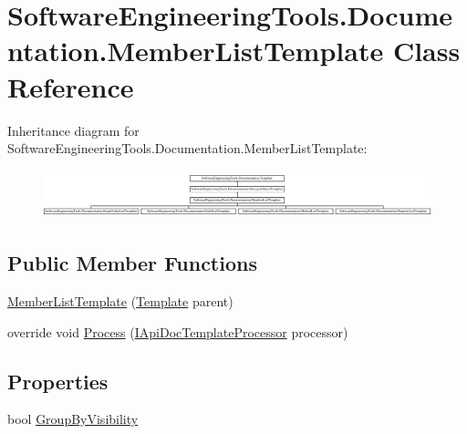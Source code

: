 \hypertarget{class_software_engineering_tools_1_1_documentation_1_1_member_list_template}{\section{Software\+Engineering\+Tools.\+Documentation.\+Member\+List\+Template Class Reference}
\label{class_software_engineering_tools_1_1_documentation_1_1_member_list_template}
}
Inheritance diagram for Software\+Engineering\+Tools.\+Documentation.\+Member\+List\+Template\+:\begin{figure}[H]
\begin{center}
\leavevmode
\includegraphics[height=1.414141cm]{class_software_engineering_tools_1_1_documentation_1_1_member_list_template}
\end{center}
\end{figure}
\subsection*{Public Member Functions}
\begin{DoxyCompactItemize}
\item 
\hyperlink{class_software_engineering_tools_1_1_documentation_1_1_member_list_template_ada574e9d8378fb068508b2222e7caa59}{Member\+List\+Template} (\hyperlink{class_software_engineering_tools_1_1_documentation_1_1_template}{Template} parent)
\item 
override void \hyperlink{class_software_engineering_tools_1_1_documentation_1_1_member_list_template_a2aa1b88d7045524e082ad04043905b98}{Process} (\hyperlink{interface_software_engineering_tools_1_1_documentation_1_1_i_api_doc_template_processor}{I\+Api\+Doc\+Template\+Processor} processor)
\end{DoxyCompactItemize}
\subsection*{Properties}
\begin{DoxyCompactItemize}
\item 
bool \hyperlink{class_software_engineering_tools_1_1_documentation_1_1_member_list_template_ae4d02d5b68476be52bfabae029c21135}{Group\+By\+Visibility}
\end{DoxyCompactItemize}


